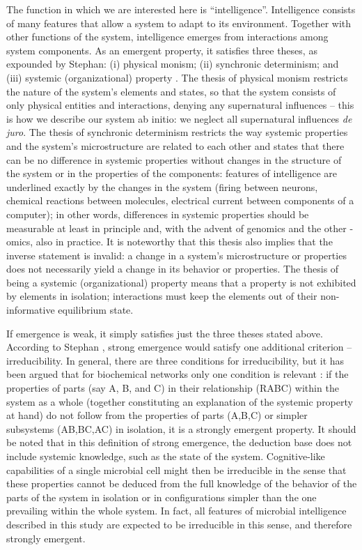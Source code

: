 The function in which we are interested here is ``intelligence''. Intelligence consists of many features that allow a system to adapt to its environment. Together with other functions of the system, intelligence emerges from interactions among system components. As an emergent property, it satisfies three theses, as expounded by Stephan: (i) physical monism; (ii) synchronic determinism; and (iii) systemic (organizational) property \cite{stephan_varieties_1999}. The thesis of physical monism restricts the nature of the system’s elements and states, so that the system consists of only physical entities and interactions, denying any supernatural influences – this is how we describe our system ab initio: we neglect all supernatural influences \textit{de juro}. The thesis of synchronic determinism restricts the way systemic properties and the system’s microstructure are related to each other and states that there can be no difference in systemic properties without changes in the structure of the system or in the properties of the components: features of intelligence are underlined exactly by the changes in the system (firing between neurons, chemical reactions between molecules, electrical current between components of a computer); in other words, differences in systemic properties should be measurable at least in principle and, with the advent of genomics and the other -omics, also in practice. It is noteworthy that this thesis also implies that the inverse statement is invalid: a change in a system’s microstructure or properties does not necessarily yield a change in its behavior or properties. The thesis of being a systemic (organizational) property means that a property is not exhibited by elements in isolation; interactions must keep the elements out of their non-informative equilibrium state.

If emergence is weak, it simply satisfies just the three theses stated above. According to Stephan \cite{stephan_varieties_1999,stephan_dual_2006}, strong emergence would satisfy one additional criterion – irreducibility. In general, there are three conditions for irreducibility, but it has been argued that for biochemical networks only one condition is relevant \cite{boogerd_emergence_2005}: if the properties of parts (say A, B, and C) in their relationship (RABC) within the system as a whole (together constituting an explanation of the systemic property at hand) do not follow from the properties of parts (A,B,C) or simpler subsystems (AB,BC,AC) in isolation, it is a strongly emergent property. It should be noted that in this definition of strong emergence, the deduction base does not include systemic knowledge, such as the state of the system. Cognitive-like capabilities of a single microbial cell might then be irreducible in the sense that these properties cannot be deduced from the full knowledge of the behavior of the parts of the system in isolation or in configurations simpler than the one prevailing within the whole system. In fact, all features of microbial intelligence described in this study are expected to be irreducible in this sense, and therefore strongly emergent.


